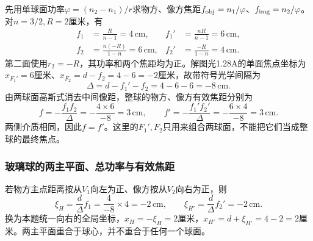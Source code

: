 \documentclass[UTF8,fontset=fandol,a4paper,11pt]{ctexart}
\newcommand{\figcaption}[1]{\par\vspace{2pt}{\small\color{muted}#1}\par}
\begin{document}
先用单球面功率$\varphi=(n_2-n_1)/r$求物方、像方焦距$f_{\rm obj}=n_1/\varphi$、$f_{\rm img}=n_2/\varphi$。对$n=3/2,R=2$厘米，有
\[
\begin{aligned}
f_1&=\frac{R}{n-1}=4\,\mathrm{cm},&
f_1'&=\frac{nR}{n-1}=6\,\mathrm{cm},\\
f_2&=\frac{n(-R)}{1-n}=6\,\mathrm{cm},&
f_2'&=\frac{-R}{1-n}=4\,\mathrm{cm}.
\end{aligned}
\]
第二面使用$r_2=-R$，其功率和两个焦距均为正。解图光1.28A的单面焦点坐标为$x_{F_1'}=6$厘米、$x_{F_2}=d-f_2=4-6=-2$厘米，故带符号光学间隔为
\[
\Delta=d-f_1'-f_2=4-6-6=-8\,\mathrm{cm}.
\]
由两球面高斯式消去中间像距，整球的物方、像方有效焦距分别为
\[
f=-\frac{f_1f_2}{\Delta}
 =-\frac{4\times6}{-8}=3\,\mathrm{cm},
\qquad
f'=-\frac{f_1'f_2'}{\Delta}
 =-\frac{6\times4}{-8}=3\,\mathrm{cm}.
\]
两侧介质相同，因此$f=f'$。这里的$F_1',F_2$只用来组合两球面，不能把它们当成整球的最终焦点。
\begin{center}\begin{minipage}{.97\linewidth}\centering
{}
\figcaption{解图光1.28A\quad 两单面焦点间的有向光学间隔}
\end{minipage}\end{center}

\subsubsection*{玻璃球的两主平面、总功率与有效焦距}
若物方主点距离按从$V_1$向左为正、像方按从$V_2$向右为正，则
\[
\xi_H=\frac d\Delta f_1=\frac4{-8}\times4=-2\,\mathrm{cm},
\qquad
\xi_{H'}=\frac d\Delta f_2'=-2\,\mathrm{cm}.
\]
换为本题统一向右的全局坐标，$x_H=-\xi_H=2$厘米，$x_{H'}=d+\xi_{H'}=4-2=2$厘米。两主平面重合于球心，并不重合于任何一个球面。
\end{document}

